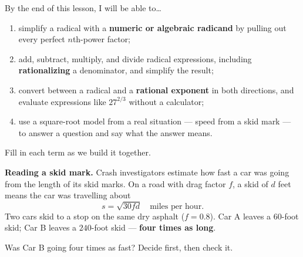 \documentclass[10pt]{article}
\begin{document}

\vspace{0.15in}

\begin{objectivebox}
\small
By the end of this lesson, I will be able to\dots
\begin{enumerate}[leftmargin=1.5em, itemsep=2pt, topsep=3pt]
  \item simplify a radical with a \textbf{numeric or algebraic radicand} by pulling out every
        perfect $n$th-power factor;
  \item add, subtract, multiply, and divide radical expressions, including \textbf{rationalizing}
        a denominator, and simplify the result;
  \item convert between a radical and a \textbf{rational exponent} in both directions, and
        evaluate expressions like $27^{2/3}$ without a calculator;
  \item use a square-root model from a real situation --- speed from a skid mark ---
        to answer a question and say what the answer means.
\end{enumerate}
\end{objectivebox}

\vspace{0.10in}

\boxguard
\begin{vocabbox}
\small
Fill in each term as we build it together.
\end{vocabbox}

\vspace{0.10in}

\boxguard[12]
\begin{hookbox}
\small
\textbf{Reading a skid mark.} Crash investigators estimate how fast a car was going from the
length of its skid marks. On a road with drag factor $f$, a skid of $d$ feet means the car was
travelling about
\[ s = \sqrt{30fd} \quad \text{miles per hour.} \]
Two cars skid to a stop on the same dry asphalt ($f=0.8$). Car A leaves a $60$-foot skid;
Car B leaves a $240$-foot skid --- \textbf{four times as long}.

Was Car B going four times as fast? Decide first, then check it.

\end{hookbox}
\end{document}
